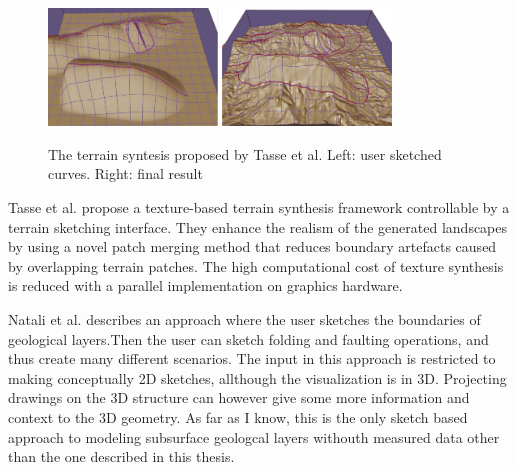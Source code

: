 \documentclass[a4paper,12pt]{report}
\begin{document}
\begin{figure}
 \centering
 \includegraphics[width=0.4\textwidth]{thesis/related/tasse1.png}
 \includegraphics[width=0.4\textwidth]{thesis/related/tasse2.png}
 \caption{The terrain syntesis proposed by Tasse et al. Left: user sketched curves. Right: final result }
 \label{fig:tasse}
\end{figure}

 
 
Tasse et al. \cite{tasse2012enhanced} propose a texture-based terrain synthesis framework controllable by
a terrain sketching interface. They enhance the realism of the generated landscapes by using a novel patch merging
method that reduces boundary artefacts caused by overlapping terrain patches. The high computational cost of texture
synthesis is reduced with a parallel implementation on graphics hardware.


 







Natali et al. \cite{natalirapid} describes an approach where the user sketches the boundaries of geological layers.Then the user can sketch folding and faulting operations, and thus create many different scenarios. The input in this approach is restricted to making conceptually 2D sketches, allthough the visualization is in 3D. Projecting drawings on the 3D structure can however give some more information and context to the 3D geometry.  As far as I know, this is the only sketch based approach to modeling subsurface geologcal layers withouth measured data other than the one described in this thesis.
\end{document}
